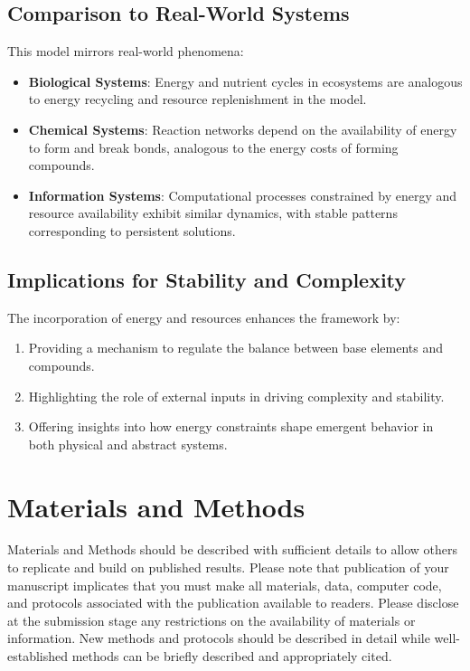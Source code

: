 \documentclass[entropy,article,submit,pdftex,moreauthors]{Definitions/mdpi}
\begin{document}
\subsection{Comparison to Real-World Systems}

This model mirrors real-world phenomena:
\begin{itemize}
    \item \textbf{Biological Systems}: Energy and nutrient cycles in ecosystems are analogous to energy recycling and resource replenishment in the model.
    \item \textbf{Chemical Systems}: Reaction networks depend on the availability of energy to form and break bonds, analogous to the energy costs of forming compounds.
    \item \textbf{Information Systems}: Computational processes constrained by energy and resource availability exhibit similar dynamics, with stable patterns corresponding to persistent solutions.
\end{itemize}

\subsection{Implications for Stability and Complexity}

The incorporation of energy and resources enhances the framework by:
\begin{enumerate}
    \item Providing a mechanism to regulate the balance between base elements and compounds.
    \item Highlighting the role of external inputs in driving complexity and stability.
    \item Offering insights into how energy constraints shape emergent behavior in both physical and abstract systems.
\end{enumerate}




\section{Materials and Methods}

Materials and Methods should be described with sufficient details to allow others to replicate and build on published results. Please note that publication of your manuscript implicates that you must make all materials, data, computer code, and protocols associated with the publication available to readers. Please disclose at the submission stage any restrictions on the availability of materials or information. New methods and protocols should be described in detail while well-established methods can be briefly described and appropriately cited.
\end{document}
